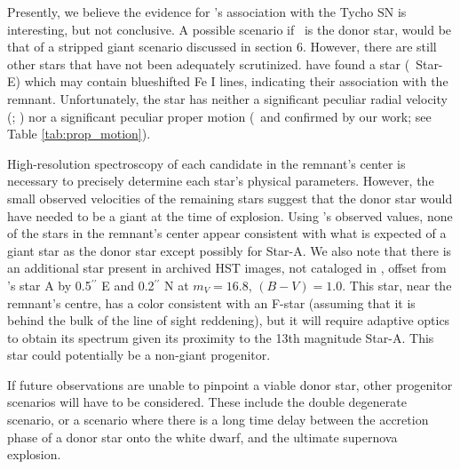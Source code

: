 Presently, we believe the evidence for \starg's association with the Tycho SN is interesting, but not conclusive.
A possible scenario if \starg\ is the donor star, would be that of a stripped giant scenario discussed in section 6.  
However, there are still other stars that have not been adequately
scrutinized. \citet{2007PASJ...59..811I} have found a star (\rl\
Star-E) which may contain blueshifted Fe I lines, indicating their
association with the remnant. Unfortunately, the star has neither
a significant peculiar radial velocity (\citealt{2007PASJ...59..811I}; \rl)
 nor a significant peculiar proper motion (\rl\ and confirmed by
our work; see Table \ref{tab:prop_motion}).

High-resolution spectroscopy of each candidate in the remnant's center is necessary to
precisely determine each star's physical parameters. However, the small observed
velocities of the remaining stars suggest that the donor star would
have needed to be a giant at the time of explosion. Using \rl's
observed values, none of the stars in the remnant's center appear
consistent with what is expected of a giant star as the donor star
except possibly for Star-A.  We also note that there is an additional
star present in archived HST images, not cataloged in \rl, offset from \rl's star A  by
0.5$^{\prime\prime}$ E and 0.2$^{\prime\prime}$ N at $m_V=16.8$,
$(B-V)=1.0$. This star, near the remnant's centre, has a color
consistent with an F-star (assuming that it is behind the bulk of the
line of sight reddening), but it will require adaptive optics to
obtain its spectrum given its proximity to the 13th magnitude Star-A. This star could potentially be a non-giant
progenitor.

If future observations are unable to pinpoint a viable donor star,
other progenitor scenarios will have to be considered. These include
the double degenerate scenario, or a scenario where there is a long
time delay between the accretion phase of a donor star onto the white dwarf, and the ultimate supernova
explosion.

